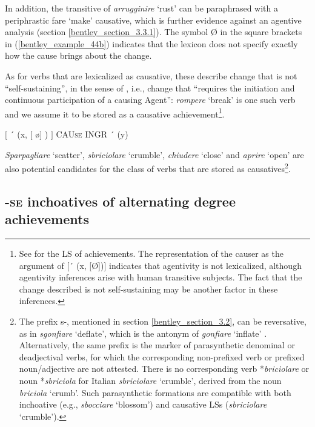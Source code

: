 \documentclass[output=paper,colorlinks,citecolor=brown
]{langscibook}
\begin{document}
In addition, the transitive of \textit{arrugginire} ‘rust’ can be paraphrased with a periphrastic fare ‘make’ causative, which is further evidence against an agentive analysis (section \ref{bentley_section_3.3.1}). The symbol Ø in the square brackets in (\ref{bentley_example_44b}) indicates that the lexicon does not specify exactly how the cause brings about the change.

As for verbs that are lexicalized as causative, these describe change that is not “self-sustaining”, in the sense of \citet[496]{kiparsky1997remarks}, i.e., change that “requires the initiation and continuous participation of a causing Agent”: \textit{rompere} ‘break’ is one such verb and we assume it to be stored as a causative achievement\footnote{See \citet[114]{vanvalin2023principles} for the LS of achievements. The representation of the causer as the argument of [´ (x, [Ø])] indicates  that agentivity is not lexicalized, although agentivity inferences arise with human transitive subjects. The fact that the change described is not self-sustaining may be another factor in these inferences.}. 

\ea \label{bentley_example_47}
    $\lbrack$ ´ (x, $\lbrack$ \o $\rbrack$ ) $\rbrack$ CAU\textsc{se} INGR ´ (y)
\z

\textit{Sparpagliare} ‘scatter’, \textit{sbriciolare} ‘crumble’, \textit{chiudere} ‘close’ and \textit{aprire} ‘open’ are also potential candidates for the class of verbs that are stored as causatives\footnote{The prefix s-, mentioned in section \ref{bentley_section_3.2}, can be reversative, as in \textit{sgonfiare} ‘deflate’, which is the antonym of \textit{gonfiare} ‘inflate’ \citep{iacobini2004prefissazione}. Alternatively, the same prefix is the marker of parasynthetic denominal or deadjectival verbs, for which the corresponding non-prefixed verb or prefixed noun/adjective are not attested. There is no corresponding verb *\textit{briciolare} or noun *\textit{sbriciola} for Italian \textit{sbriciolare} ‘crumble’, derived from the noun \textit{briciola} ‘crumb’. Such parasynthetic formations are compatible with both inchoative (e.g., \textit{sbocciare} ‘blossom’) and causative LSs (\textit{sbriciolare} ‘crumble’).}. 

\subsection{-\textsc{se} inchoatives of alternating degree achievements}
\label{bentley_section_5.3}
\end{document}
